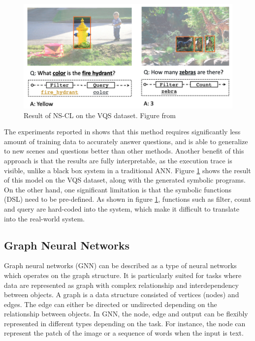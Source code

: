 \documentclass[journal]{IEEEtran}
\begin{document}
\begin{figure}[htb]
  \centering
  \includegraphics[width=0.8\columnwidth]{nscl.png}
  \caption{Result of NS-CL on the VQS dataset. Figure from \cite{Mao2019NeuroSymbolic}}
  \label{nscl}
\end{figure}

The experiments reported in \cite{Mao2019NeuroSymbolic} shows that this method requires significantly less amount of training data to accurately answer questions, 
and is able to generalize to new scenes and questions better than other methods. 
Another benefit of this approach is that the results are fully interpretable, as the execution trace is visible, 
unlike a black box system in a traditional ANN.
Figure \ref{nscl} shows the result of this model on the VQS dataset, along with the generated symbolic programs. 
On the other hand, one significant limitation is that the symbolic functions (DSL) need to be pre-defined. 
As shown in figure \ref{nscl}, functions such as filter, count and query are hard-coded into the system, 
which make it difficult to translate into the real-world system.


\subsection{Graph Neural Networks}

Graph neural networks (GNN) can be described as a type of neural networks which operates on the graph structure.
It is particularly suited for tasks where data are represented as graph with complex relationship and interdependency between objects.
A graph is a data structure consisted of vertices (nodes) and edges.
The edge can either be directed or undirected depending on the relationship between objects.
In GNN, the node, edge and output can be flexibly represented in different types depending on the task. 
For instance, the node can represent the patch of the image or a sequence of words when the input is text.
\end{document}
